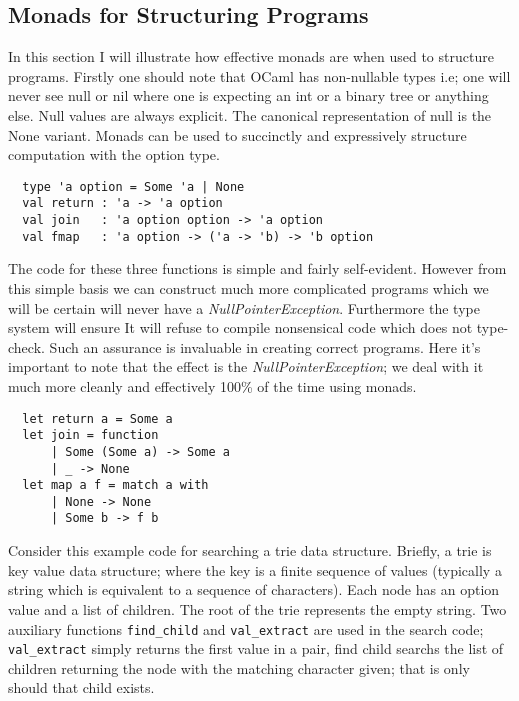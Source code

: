 \subsection{Monads for Structuring Programs}
In this section I will illustrate how effective monads are when used to structure programs.
Firstly one should note that OCaml has non-nullable types
i.e; one will never see null or nil where one is expecting an
int or a binary tree or anything else.
Null values are always explicit.
The canonical representation of null is the None variant.
Monads can be used to succinctly and expressively structure computation with the option type.

\begin{verbatim}
  type 'a option = Some 'a | None
  val return : 'a -> 'a option
  val join   : 'a option option -> 'a option
  val fmap   : 'a option -> ('a -> 'b) -> 'b option
\end{verbatim}

The code for these three functions is simple and fairly self-evident.
However from this simple basis we can construct much more complicated programs which we
will be certain will never have a \textit{NullPointerException}.
Furthermore the type system will ensure 
It will refuse to compile nonsensical code which does not type-check.
Such an assurance is invaluable in creating correct programs.
Here it's important to note that the effect is the \textit{NullPointerException};
we deal with it much more cleanly and effectively 100\% of the time using monads.

\begin{verbatim}
  let return a = Some a
  let join = function
      | Some (Some a) -> Some a
      | _ -> None
  let map a f = match a with
      | None -> None
      | Some b -> f b
\end{verbatim}

Consider this example code for searching a trie data structure.
Briefly, a trie is key value data structure;
where the key is a finite sequence of values
(typically a string which is equivalent to a sequence of characters).
Each node has an option value and a list of children.
The root of the trie represents the empty string.
Two auxiliary functions \texttt{find\_child} and \texttt{val\_extract}
are used in the search code; \texttt{val\_extract}
simply returns the first value in a pair,
find child searchs the list of children returning
the node with the matching character given;
that is only should that child exists.

